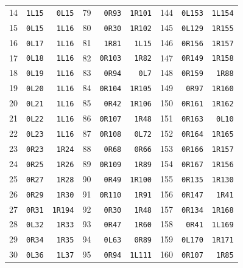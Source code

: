 \begin{center}
\begin{tabular}{rrr@{\hspace{17pt}}rrr@{\hspace{17pt}}rrr}
14 & \texttt{1L15} & \texttt{0L15} & 79 & \texttt{0R93} & \texttt{1R101} & 144 & \texttt{0L153} & \texttt{1L154}\\
15 & \texttt{0L15} & \texttt{1L16} & 80 & \texttt{0R30} & \texttt{1R102} & 145 & \texttt{0L129} & \texttt{1R155}\\
16 & \texttt{0L17} & \texttt{1L16} & 81 & \texttt{1R81} & \texttt{1L15} & 146 & \texttt{0R156} & \texttt{1R157}\\
17 & \texttt{0L18} & \texttt{1L16} & 82 & \texttt{0R103} & \texttt{1R82} & 147 & \texttt{0R149} & \texttt{1R158}\\
18 & \texttt{0L19} & \texttt{1L16} & 83 & \texttt{0R94} & \texttt{0L7} & 148 & \texttt{0R159} & \texttt{1R88}\\
19 & \texttt{0L20} & \texttt{1L16} & 84 & \texttt{0R104} & \texttt{1R105} & 149 & \texttt{0R97} & \texttt{1R160}\\
20 & \texttt{0L21} & \texttt{1L16} & 85 & \texttt{0R42} & \texttt{1R106} & 150 & \texttt{0R161} & \texttt{1R162}\\
21 & \texttt{0L22} & \texttt{1L16} & 86 & \texttt{0R107} & \texttt{1R48} & 151 & \texttt{0R163} & \texttt{0L10}\\
22 & \texttt{0L23} & \texttt{1L16} & 87 & \texttt{0R108} & \texttt{0L72} & 152 & \texttt{0R164} & \texttt{1R165}\\
23 & \texttt{0R23} & \texttt{1R24} & 88 & \texttt{0R68} & \texttt{0R66} & 153 & \texttt{0R166} & \texttt{1R157}\\
24 & \texttt{0R25} & \texttt{1R26} & 89 & \texttt{0R109} & \texttt{1R89} & 154 & \texttt{0R167} & \texttt{1R156}\\
25 & \texttt{0R27} & \texttt{1R28} & 90 & \texttt{0R49} & \texttt{1R100} & 155 & \texttt{0R135} & \texttt{1R130}\\
26 & \texttt{0R29} & \texttt{1R30} & 91 & \texttt{0R110} & \texttt{1R91} & 156 & \texttt{0R147} & \texttt{1R41}\\
27 & \texttt{0R31} & \texttt{1R194} & 92 & \texttt{0R30} & \texttt{1R48} & 157 & \texttt{0R134} & \texttt{1R168}\\
28 & \texttt{0L32} & \texttt{1R33} & 93 & \texttt{0R47} & \texttt{1R60} & 158 & \texttt{0R41} & \texttt{1L169}\\
29 & \texttt{0R34} & \texttt{1R35} & 94 & \texttt{0L63} & \texttt{0R89} & 159 & \texttt{0L170} & \texttt{1R171}\\
30 & \texttt{0L36} & \texttt{1L37} & 95 & \texttt{0R94} & \texttt{1L111} & 160 & \texttt{0R107} & \texttt{1R85}\\

\end{tabular}
\end{center}
